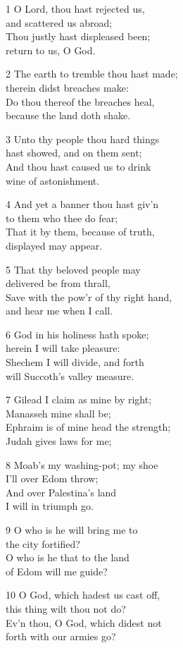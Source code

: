 1 O Lord, thou hast rejected us,\\
and scattered us abroad;\\
Thou justly hast displeased been;\\
return to us, O God.

2 The earth to tremble thou hast made;\\
therein didst breaches make:\\
Do thou thereof the breaches heal,\\
because the land doth shake.

3 Unto thy people thou hard things\\
hast showed, and on them sent;\\
And thou hast caused us to drink\\
wine of astonishment.

4 And yet a banner thou hast giv’n\\
to them who thee do fear;\\
That it by them, because of truth,\\
displayed may appear.

5 That thy beloved people may\\
delivered be from thrall,\\
Save with the pow’r of thy right hand,\\
and hear me when I call.

6 God in his holiness hath spoke;\\
herein I will take pleasure:\\
Shechem I will divide, and forth\\
will Succoth’s valley measure.

7 Gilead I claim as mine by right;\\
Manasseh mine shall be;\\
Ephraim is of mine head the strength;\\
Judah gives laws for me;

8 Moab’s my washing-pot; my shoe\\
I’ll over Edom throw;\\
And over Palestina’s land\\
I will in triumph go.

9 O who is he will bring me to\\
the city fortified?\\
O who is he that to the land\\
of Edom will me guide?

10 O God, which hadest us cast off,\\
this thing wilt thou not do?\\
Ev’n thou, O God, which didest not\\
forth with our armies go?

